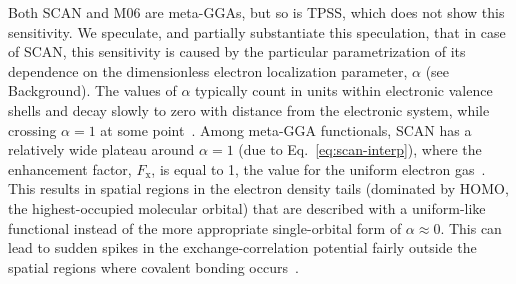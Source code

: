 Both SCAN and M06 are meta-GGAs, but so is TPSS, which does not show this sensitivity.
We speculate, and partially substantiate this speculation, that in case of SCAN, this sensitivity is caused by the particular parametrization of its dependence on the dimensionless electron localization parameter, $\alpha$ (see Background).
The values of $\alpha$ typically count in units within electronic valence shells and decay slowly to zero with distance from the electronic system, while crossing $\alpha=1$ at some point~\cite{SunPRL13,BeckeJCP90}.
Among meta-GGA functionals, SCAN has a relatively wide plateau around $\alpha=1$ (due to Eq.~\ref{eq:scan-interp}), where the enhancement factor, $F_\mathrm x$, is equal to 1, the value for the uniform electron gas~\cite{LoosJCP17}.
This results in spatial regions in the electron density tails (dominated by HOMO, the highest-occupied molecular orbital) that are described with a uniform-like functional instead of the more appropriate single-orbital form of $\alpha\approx0$.
This can lead to sudden spikes in the exchange-correlation potential fairly outside the spatial regions where covalent bonding occurs~\cite{Gerit-private}.


